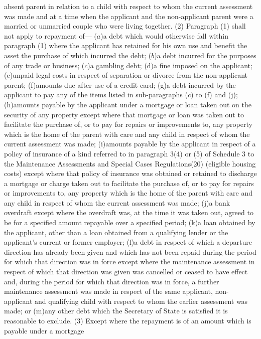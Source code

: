 \documentclass[a4paper]{article}
\begin{document}
absent parent in relation to a child with respect to whom the current assessment
was made and at a time when the applicant and the non-applicant parent were a
married or unmarried couple who were living together.
(2) Paragraph (1) shall not apply to repayment of—
($a$)a debt which would otherwise fall within paragraph (1) where the applicant
has retained for his own use and benefit the asset the purchase of which
incurred the debt;
($b$)a debt incurred for the purposes of any trade or business;
($c$)a gambling debt;
(d)a fine imposed on the applicant;
(e)unpaid legal costs in respect of separation or divorce from the non-applicant
parent;
(f)amounts due after use of a credit card;
(g)a debt incurred by the applicant to pay any of the items listed in
sub-paragraphs ($c$) to (f) and (j);
(h)amounts payable by the applicant under a mortgage or loan taken out on the
security of any property except where that mortgage or loan was taken out to
facilitate the purchase of, or to pay for repairs or improvements to, any
property which is the home of the parent with care and any child in respect of
whom the current assessment was made;
(i)amounts payable by the applicant in respect of a policy of insurance of a
kind referred to in paragraph 3(4) or (5) of Schedule 3 to the Maintenance
Assessments and Special Cases Regulations(20) (eligible housing costs) except
where that policy of insurance was obtained or retained to discharge a mortgage
or charge taken out to facilitate the purchase of, or to pay for repairs or
improvements to, any property which is the home of the parent with care and any
child in respect of whom the current assessment was made;
(j)a bank overdraft except where the overdraft was, at the time it was taken
out, agreed to be for a specified amount repayable over a specified period;
(k)a loan obtained by the applicant, other than a loan obtained from a
qualifying lender or the applicant’s current or former employer;
(l)a debt in respect of which a departure direction has already been given and
which has not been repaid during the period for which that direction was in
force except where the maintenance assessment in respect of which that direction
was given was cancelled or ceased to have effect and, during the period for
which that direction was in force, a further maintenance assessment was made in
respect of the same applicant, non-applicant and qualifying child with respect
to whom the earlier assessment was made; or
(m)any other debt which the Secretary of State is satisfied it is reasonable to
exclude.
(3) Except where the repayment is of an amount which is payable under a mortgage
\end{document}
